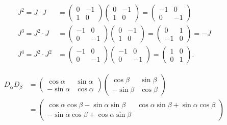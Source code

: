 \begin{loesung}
\begin{teilaufgaben}
\item
\begin{align*}
J^2=J\cdot J
&=
\begin{pmatrix}0&-1\\1&0\end{pmatrix}
\begin{pmatrix}0&-1\\1&0\end{pmatrix}
=
\begin{pmatrix}-1&0\\0&-1\end{pmatrix}\\
J^3=J^2\cdot J&=
\begin{pmatrix}-1&0\\0&-1\end{pmatrix}
\begin{pmatrix}0&-1\\1&0\end{pmatrix}
=
\begin{pmatrix}0&1\\-1&0\end{pmatrix}=-J
\\
J^4=J^2\cdot J^2
&=
\begin{pmatrix}-1&0\\0&-1\end{pmatrix}
\begin{pmatrix}-1&0\\0&-1\end{pmatrix}
=
\begin{pmatrix}1&0\\0&1\end{pmatrix}.
\end{align*}
\item
\begin{align*}
D_\alpha
D_\beta
&=
\begin{pmatrix}\cos\alpha&\sin\alpha\\
-\sin\alpha&\cos\alpha\end{pmatrix}
\begin{pmatrix}\cos\beta&\sin\beta\\
-\sin\beta&\cos\beta\end{pmatrix}
\\
&=
\begin{pmatrix}
\cos\alpha\cos\beta-\sin\alpha\sin\beta
	&\cos\alpha\sin\beta+\sin\alpha\cos\beta\\
-\sin\alpha\cos\beta+\cos\alpha\sin\beta

\end{pmatrix}
\end{align*}
\end{teilaufgaben}
\end{loesung}

